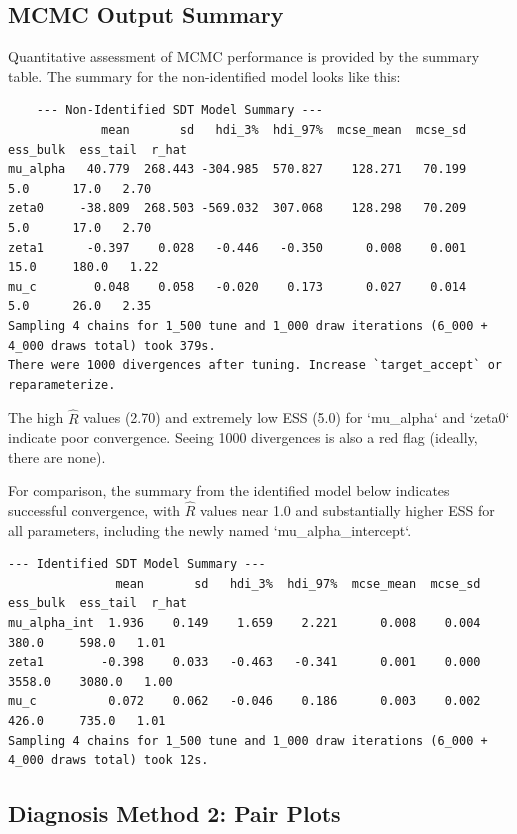 \documentclass[12pt]{article}
\begin{document}
\subsection*{MCMC Output Summary}

Quantitative assessment of MCMC performance is provided by the summary table. The summary for the non-identified model looks like this:

\footnotesize
\begin{verbatim}
    --- Non-Identified SDT Model Summary ---
             mean       sd   hdi_3%  hdi_97%  mcse_mean  mcse_sd  ess_bulk  ess_tail  r_hat
mu_alpha   40.779  268.443 -304.985  570.827    128.271   70.199       5.0      17.0   2.70
zeta0     -38.809  268.503 -569.032  307.068    128.298   70.209       5.0      17.0   2.70
zeta1      -0.397    0.028   -0.446   -0.350      0.008    0.001      15.0     180.0   1.22
mu_c        0.048    0.058   -0.020    0.173      0.027    0.014       5.0      26.0   2.35
Sampling 4 chains for 1_500 tune and 1_000 draw iterations (6_000 + 4_000 draws total) took 379s.
There were 1000 divergences after tuning. Increase `target_accept` or reparameterize.
\end{verbatim}
\normalsize

The high $\hat{R}$ values (2.70) and extremely low ESS (5.0) for `mu\_alpha` and `zeta0` indicate poor convergence. Seeing 1000 divergences is also a red flag (ideally, there are none).

For comparison, the summary from the identified model below indicates successful convergence, with $\hat{R}$ values near 1.0 and substantially higher ESS for all parameters, including the newly named `mu\_alpha\_intercept`.

\footnotesize
\begin{verbatim}
--- Identified SDT Model Summary ---
               mean       sd   hdi_3%  hdi_97%  mcse_mean  mcse_sd  ess_bulk  ess_tail  r_hat
mu_alpha_int  1.936    0.149    1.659    2.221      0.008    0.004     380.0     598.0   1.01
zeta1        -0.398    0.033   -0.463   -0.341      0.001    0.000    3558.0    3080.0   1.00
mu_c          0.072    0.062   -0.046    0.186      0.003    0.002     426.0     735.0   1.01
Sampling 4 chains for 1_500 tune and 1_000 draw iterations (6_000 + 4_000 draws total) took 12s.
\end{verbatim}
\normalsize

\subsection*{Diagnosis Method 2: Pair Plots}
\end{document}

